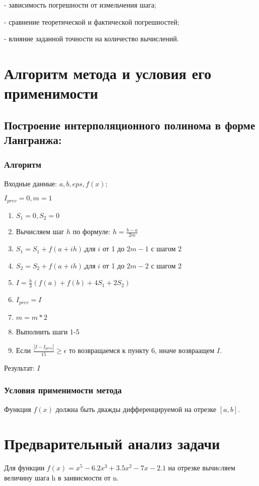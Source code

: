 \documentclass{article}
\begin{document}
	- зависимость погрешности от измельчения шага;
	
	- сравнение теоретической и фактической погрешностей;
	
	- влияние заданной точности на количество вычислений.
	\section{Алгоритм метода и условия его применимости}   

	\subsection{Построение интерполяционного полинома в форме Лангранжа:}
	\subsubsection{Алгоритм}
	Входные данные: $a, b,  eps, f(x)$;  
	
	$I_{prev} = 0, m = 1$
	\begin{enumerate}
		\item $S_1 = 0, S_2 = 0$
		\item Вычисляем шаг $h$ по формуле: $h = \frac{b-a}{2m} $
		\item $S_1 = S_1 + f(a + ih)$,для $i$ от 1 до $2m-1$ с шагом 2
		\item $S_2 = S_2 + f(a + ih)$,для $i$ от 1 до $2m-2$ с шагом 2
		\item $I = \frac{h}{3}(f(a)+f(b)+4S_1+2S_2)$
		\item $I_{prev} = I$
		\item $m = m * 2$
		\item Выполнить шаги 1-5
		\item Если $\frac{|I-I_{prev}|}{15} \geq \epsilon$ то возвращаемся к пункту 6, иначе возвраащем $I$.
	\end{enumerate}
	
	Результат: $I$
	
	\subsubsection{Условия применимости метода}
	Функция $f(x)$ должна быть дважды дифференцируемой на
	отрезке $[a, b]$.
	
	\section{Предварительный анализ задачи}
	Для функции $f(x) = x^5 - 6.2x^3 + 3.5x^2 -7x -2.1$ на отрезке
	 вычиcляем величину шага h в заивисмости от n.
	
\end{document}
